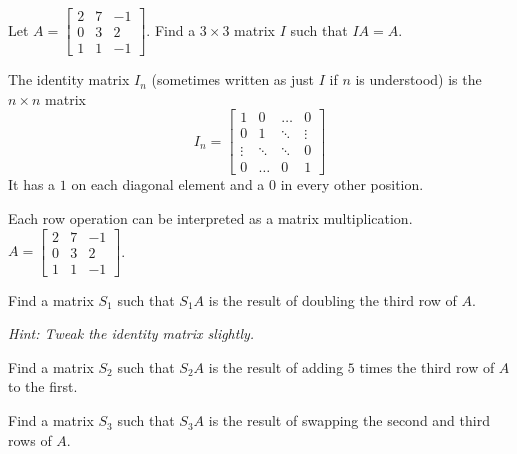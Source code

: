 
\begin{applicationActivities}{2}{22}

\begin{activity}{5}
Let $A=\begin{bmatrix} 2 & 7 & -1 \\ 0 & 3 & 2 \\ 1 & 1 & -1 \end{bmatrix}$.  Find a $3 \times 3$ matrix $I$ such that $IA=A$.
\end{activity}

\begin{definition}
The identity matrix $I_n$ (sometimes written as just $I$ if $n$ is understood) is  the $n \times n$ matrix $$I_n = \begin{bmatrix} 1 & 0  & \hdots & 0 \\ 0 & 1 & \ddots & \vdots  \\ \vdots & \ddots & \ddots & 0 \\ 0 & \hdots & 0 & 1 \end{bmatrix}$$
It has a $1$ on each diagonal element and a $0$ in every other position.
\end{definition}

\begin{activity}{15}
Each row operation can be interpreted as a matrix multiplication.  $A=\begin{bmatrix} 2 & 7 & -1 \\ 0 & 3 & 2 \\ 1 & 1 & -1 \end{bmatrix}$.


 \begin{subactivity}
 Find a matrix $S_1$ such that $S_1A$ is the result of doubling the third row of $A$.
 
 {\em Hint:  Tweak the identity matrix slightly.}
 \end{subactivity}
 \begin{subactivity}
 Find a matrix $S_2$ such that $S_2A$ is the result of adding $5$ times the third row of $A$ to the first.
 \end{subactivity}
\begin{subactivity}
 Find a matrix $S_3$ such that $S_3A$ is the result of swapping the second and third rows of $A$.
 \end{subactivity}


\end{activity}


\end{applicationActivities}

